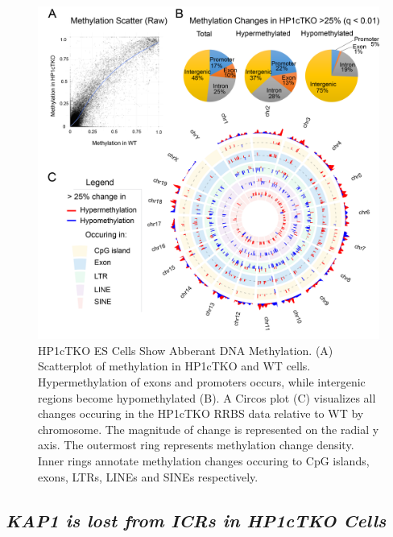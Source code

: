 \documentclass[onehalf,12pt]{beavtex}
\begin{document}
  \begin{figure}
  
  {\centering \includegraphics[width=1\linewidth, ]{./figure/results/HP1cTKO_RRBS} 
  
  }
  
  \caption[HP1cTKO ES Cells Show Abberant DNA Methylation]{HP1cTKO ES Cells Show Abberant DNA Methylation. (A) Scatterplot of methylation in HP1cTKO and WT cells. Hypermethylation of exons and promoters occurs, while intergenic regions become hypomethylated (B). A Circos plot (C) visualizes all changes occuring in the HP1cTKO RRBS data relative to WT by chromosome. The magnitude of change is represented on the radial y axis. The outermost ring represents methylation change density.  Inner rings annotate methylation changes occuring to CpG islands, exons, LTRs, LINEs and SINEs respectively.}\label{fig:RRBScircos}
  \end{figure}
  
  \subsection*{\texorpdfstring{\emph{KAP1 is lost from ICRs in HP1cTKO
  Cells}}{KAP1 is lost from ICRs in HP1cTKO Cells}}\label{kap1-is-lost-from-icrs-in-hp1ctko-cells}
  
\end{document}
